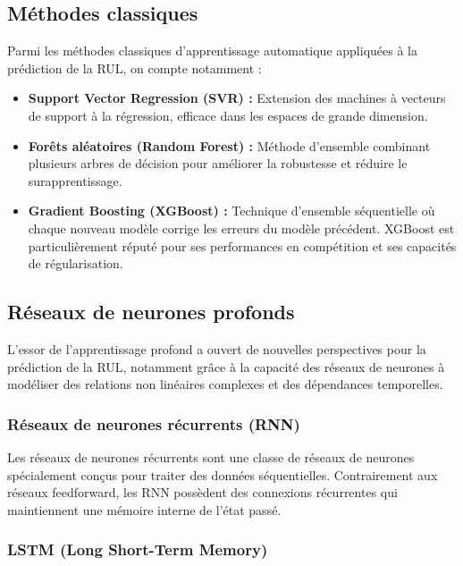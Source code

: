 \documentclass[12pt,a4paper]{report}
\theoremstyle{definition}
\begin{document}
\subsection{Méthodes classiques}

Parmi les méthodes classiques d'apprentissage automatique appliquées à la prédiction de la RUL, on compte notamment :

\begin{itemize}
    \item \textbf{Support Vector Regression (SVR) :} Extension des machines à vecteurs de support à la régression, efficace dans les espaces de grande dimension.
    \item \textbf{Forêts aléatoires (Random Forest) :} Méthode d'ensemble combinant plusieurs arbres de décision pour améliorer la robustesse et réduire le surapprentissage.
    \item \textbf{Gradient Boosting (XGBoost) :} Technique d'ensemble séquentielle où chaque nouveau modèle corrige les erreurs du modèle précédent. XGBoost est particulièrement réputé pour ses performances en compétition et ses capacités de régularisation.
\end{itemize}

\subsection{Réseaux de neurones profonds}

L'essor de l'apprentissage profond a ouvert de nouvelles perspectives pour la prédiction de la RUL, notamment grâce à la capacité des réseaux de neurones à modéliser des relations non linéaires complexes et des dépendances temporelles.

\subsubsection{Réseaux de neurones récurrents (RNN)}

Les réseaux de neurones récurrents sont une classe de réseaux de neurones spécialement conçus pour traiter des données séquentielles. Contrairement aux réseaux feedforward, les RNN possèdent des connexions récurrentes qui maintiennent une mémoire interne de l'état passé.

\subsubsection{LSTM (Long Short-Term Memory)}
\end{document}
